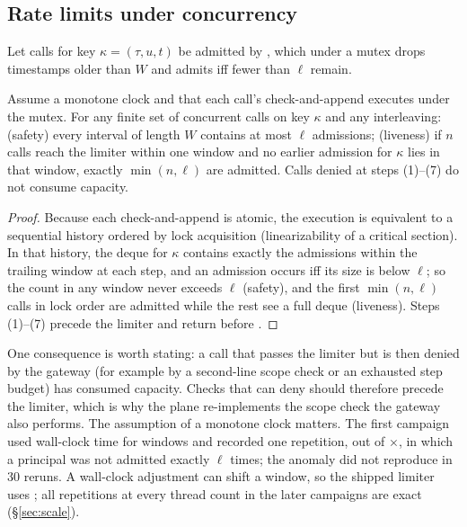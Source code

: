\subsection{Rate limits under concurrency}
Let calls for key $\kappa=(\tau,u,t)$ be admitted by , which under a mutex drops timestamps older than $W$ and admits iff fewer than $\ell$ remain.

\begin{theorem}
\label{thm:rate}
Assume a monotone clock and that each call's check-and-append executes under the mutex. For any finite set of concurrent calls on key $\kappa$ and any interleaving: (safety) every interval of length $W$ contains at most $\ell$ admissions; (liveness) if $n$ calls reach the limiter within one window and no earlier admission for $\kappa$ lies in that window, exactly $\min(n,\ell)$ are admitted. Calls denied at steps (1)--(7) do not consume capacity.
\end{theorem}
\begin{proof}
Because each check-and-append is atomic, the execution is equivalent to a sequential history ordered by lock acquisition (linearizability of a critical section). In that history, the deque for $\kappa$ contains exactly the admissions within the trailing window at each step, and an admission occurs iff its size is below $\ell$; so the count in any window never exceeds $\ell$ (safety), and the first $\min(n,\ell)$ calls in lock order are admitted while the rest see a full deque (liveness). Steps (1)--(7) precede the limiter and return before .
\end{proof}
One consequence is worth stating: a call that passes the limiter but is then denied by the gateway (for example by a second-line scope check or an exhausted step budget) has consumed capacity. Checks that can deny should therefore precede the limiter, which is why the plane re-implements the scope check the gateway also performs.
The assumption of a monotone clock matters. The first campaign used wall-clock time for windows and recorded one repetition, out of \FirstScaleConfigs{}$\times$\FirstScaleReps{}, in which a principal was not admitted exactly $\ell$ times; the anomaly did not reproduce in 30 reruns. A wall-clock adjustment can shift a window, so the shipped limiter uses ; all \ScaleReps{} repetitions at every thread count in the later campaigns are exact (\S\ref{sec:scale}).

